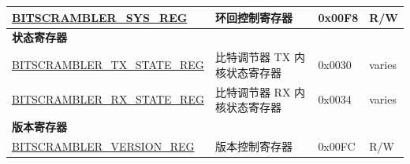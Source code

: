 \begin{longtable}{ | p{6.3cm} | p{7cm} | p{1.2cm} | p{1cm} | }
\hyperref[regdesc:BITSCRAMBLERSYSREG]{BITSCRAMBLER\_SYS\_REG} & 环回控制寄存器 & 0x00F8 & R/W \\ \hline
\multicolumn{4}{|l|}{\textbf{状态寄存器}} \\ \hline
\hyperref[regdesc:BITSCRAMBLERTXSTATEREG]{BITSCRAMBLER\_TX\_STATE\_REG} & 比特调节器 TX 内核状态寄存器 & 0x0030 & varies \\ \hline
\hyperref[regdesc:BITSCRAMBLERRXSTATEREG]{BITSCRAMBLER\_RX\_STATE\_REG} & 比特调节器 RX 内核状态寄存器 & 0x0034 & varies \\ \hline
\multicolumn{4}{|l|}{\textbf{版本寄存器}} \\ \hline
\hyperref[regdesc:BITSCRAMBLERVERSIONREG]{BITSCRAMBLER\_VERSION\_REG} & 版本控制寄存器 & 0x00FC & R/W \\ \hline
\end{longtable}
